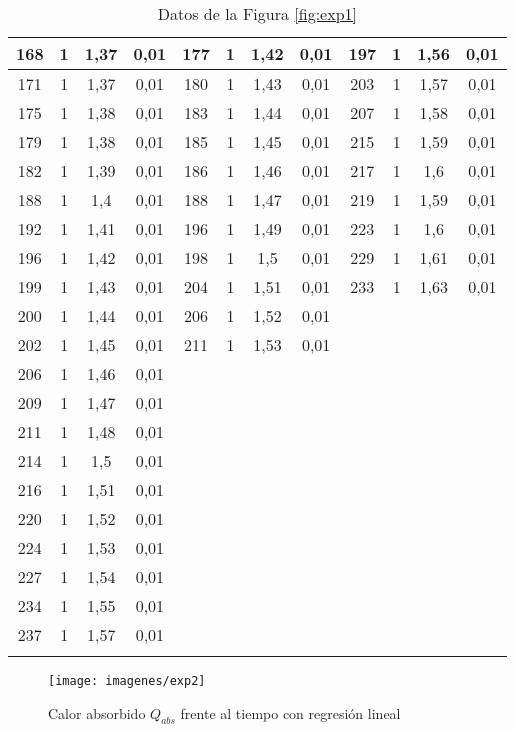 \documentclass[a4paper,12pt,spanish]{article}
\begin{document}
\begin{longtable}{|*{12}{c|}}
		168 & 1 & 1,37 & 0,01 & 177 & 1 & 1,42 & 0,01 & 197 & 1 & 1,56 & 0,01 \\ \hline 
		171 & 1 & 1,37 & 0,01 & 180 & 1 & 1,43 & 0,01 & 203 & 1 & 1,57 & 0,01 \\ \hline 
		175 & 1 & 1,38 & 0,01 & 183 & 1 & 1,44 & 0,01 & 207 & 1 & 1,58 & 0,01 \\ \hline 
		179 & 1 & 1,38 & 0,01 & 185 & 1 & 1,45 & 0,01 & 215 & 1 & 1,59 & 0,01 \\ \hline 
		182 & 1 & 1,39 & 0,01 & 186 & 1 & 1,46 & 0,01 & 217 & 1 & 1,6 & 0,01 \\ \hline 
		188 & 1 & 1,4 & 0,01 & 188 & 1 & 1,47 & 0,01 & 219 & 1 & 1,59 & 0,01 \\ \hline 
		192 & 1 & 1,41 & 0,01 & 196 & 1 & 1,49 & 0,01 & 223 & 1 & 1,6 & 0,01 \\ \hline 
		196 & 1 & 1,42 & 0,01 & 198 & 1 & 1,5 & 0,01 & 229 & 1 & 1,61 & 0,01 \\ \hline 
		199 & 1 & 1,43 & 0,01 & 204 & 1 & 1,51 & 0,01 & 233 & 1 & 1,63 & 0,01 \\ \hline 
		200 & 1 & 1,44 & 0,01 & 206 & 1 & 1,52 & 0,01 &  &  &  &  \\ \hline 
		202 & 1 & 1,45 & 0,01 & 211 & 1 & 1,53 & 0,01 &  &  &  &  \\ \hline 
		206 & 1 & 1,46 & 0,01 &  &  &  &  &  &  &  &  \\ \hline 
		209 & 1 & 1,47 & 0,01 &  &  &  &  &  &  &  &  \\ \hline 
		211 & 1 & 1,48 & 0,01 &  &  &  &  &  &  &  &  \\ \hline 
		214 & 1 & 1,5 & 0,01 &  &  &  &  &  &  &  &  \\ \hline 
		216 & 1 & 1,51 & 0,01 &  &  &  &  &  &  &  &  \\ \hline 
		220 & 1 & 1,52 & 0,01 &  &  &  &  &  &  &  &  \\ \hline 
		224 & 1 & 1,53 & 0,01 &  &  &  &  &  &  &  &  \\ \hline 
		227 & 1 & 1,54 & 0,01 &  &  &  &  &  &  &  &  \\ \hline 
		234 & 1 & 1,55 & 0,01 &  &  &  &  &  &  &  &  \\ \hline 
		237 & 1 & 1,57 & 0,01 &  &  &  &  &  &  &  &  \\ \hline 
		\caption{Datos de la Figura \ref{fig:exp1}}
	\end{longtable} 
	
	
	
	
\begin{figure}[H]
	\centering
	\texttt{[image: imagenes/exp2]}
	\caption{Calor absorbido $Q_{abs}$ frente al tiempo con regresión lineal}
	\label{fig:exp2}
\end{figure}
	
\end{document}

